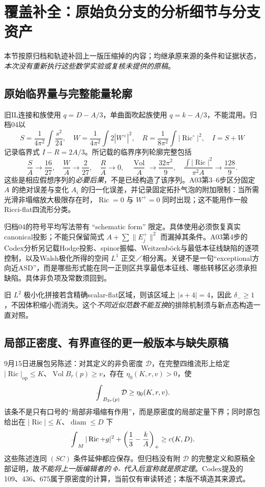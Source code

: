 \documentclass[UTF8,a4paper,11pt,fontset=fandol]{ctexart}
\numberwithin{equation}{section}
\theoremstyle{definition}
\newcommand{\Ric}{\operatorname{Ric}}
\newcommand{\Vol}{\operatorname{Vol}}
\newcommand{\diam}{\operatorname{diam}}
\newcommand{\op}{\mathrm{op}}
\newcommand{\fint}{\mathop{\rlap{\,\raisebox{0.1ex}{\tiny$-$}}\int}\nolimits}
\begin{document}
\section{覆盖补全：原始负分支的分析细节与分支资产}\label{sec:restore-a01}
本节按原归档和轨迹补回上一版压缩掉的内容；均继承原来源的条件和证据状态，\emph{本次没有重新执行这些数学实验或复核未提供的原稿}。

\subsection{原始临界量与完整能量轮廓}
旧IL连接和族使用 $q=D-A/3$，单曲面吹起族使用 $q=k-A/3$，不能混用。归档04以
\[
S=\frac1{4\pi^2}\int\frac{s^2}{24},\quad
W=\frac1{4\pi^2}\int2|W^+|^2,\quad
R=\frac1{8\pi^2}\int|\Ric^\circ|^2,\quad I=S+W
\]
记录临界式 $I-R=2A/3$。所记载的临界序列轮廓完整包括
\[
\frac{S}{A}\to\frac{16}{27},\quad \frac{W}{A}\to\frac{2}{27},\quad
\frac{R}{A}\to0,\quad \frac{\Vol}{A}\to\frac{32\pi^2}{9},\quad
\frac{\int|\Ric|^2}{\pi^2 A}\to\frac{128}{9}.
\]
这些是相应假想序列的\emph{必要后果}，不是已经构造了该序列。A03第3--6步区分固定 $A$ 的绝对误差与变化 $A_i$ 的归一化误差，并记录固定拓扑气泡的附加限制：当所需光滑非塌缩放大极限存在时，$\Ric=0$ 与 $W^+=0$ 同时出现；这不能用作一般Ricci-flat四流形分类。

归档04的符号平均写法带有 ``schematic form'' 限定。具体使用必须恢复真实canonical投影；不能只保留简式 $A+\sum\|E_j^+\|^2$ 而漏掉其条件。A03第4步的Codex分析另记载Hodge投影、spinor振幅、Weitzenb\"ock与最低本征线缺陷的逐项控制，以及Walsh极化所得的空间 $L^1$ 正交／相分离。关键不是一句“exceptional方向近ASD”，而是哪些形式能在同一正则区共享最低本征线、哪些转移区必须承担缺陷。具体非负项及常数须回到。

旧 $L^2$ 极小化拼接若含精确scalar-flat区域，则该区域上 $|s+4|=4$，因此 $\delta_-\ge1$，不因体积缩小而消失。这个\emph{不同近似范数不能互换}的排除机制须与新点态构造一直对照。

\subsection{局部正密度、有界直径的更一般版本与缺失原稿}
9月15日进展包另陈述：对其定义的非负密度 $\mathcal D$，在完整四维流形上给定 $|\Ric|_{\op}\le K$、$\Vol B_r(p)\ge v$，存在 $\eta_0(K,r,v)>0$，使
\[
\fint_{B_{2r}(p)}\mathcal D\ge\eta_0(K,r,v).
\]
该条不是只有口号的“局部非塌缩有作用”，而是原密度的局部定量下界；同时原包给出在 $|\Ric|\le K$、$\diam\le D$ 下
\[
\fint_M|\Ric+g|^2+\left(\frac13-\frac{k}{A}\right)_+\ge c(K,D).
\]
这些陈述连同 $(SC)$ 条件延伸都应保存。但归档没有附 $\mathcal D$ 的完整定义和原稿全部证明，故\emph{不能将上一版编辑者的 $\Phi_*$ 代入后宣称就是原定理}。Codex提及的109、436、675属于原密度的计算，当前仅有审读转述；本版不填造其来源式。
\end{document}
